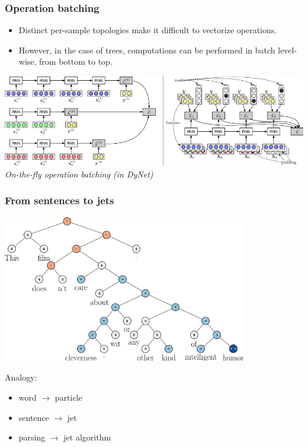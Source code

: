 \documentclass{beamer}
\begin{document}
\begin{frame}
    \frametitle{Operation batching}

    \begin{itemize}
        \item Distinct per-sample topologies make it difficult to vectorize operations.
        \item However, in the case of trees, computations can be performed in batch level-wise, from bottom to top.
    \end{itemize}

    \vspace{1cm}

    \centering
    \includegraphics[width=\textwidth]{figures/batching.png}\\
    {\it On-the-fly operation batching (in DyNet)}


\end{frame}


\begin{frame}
    \frametitle{From sentences to jets}

    \begin{center}
        \includegraphics[width=0.8\textwidth]{figures/parse-tree.png}
    \end{center}


    Analogy:
    \begin{itemize}
        \item word $\rightarrow$ particle
        \item sentence $\rightarrow$ jet
        \item parsing $\rightarrow$ jet algorithm
    \end{itemize}
\end{frame}
\end{document}
